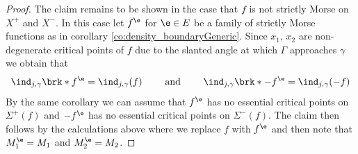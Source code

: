 \begin{proof}
  The claim remains to be shown in the case that $f$ is not strictly Morse on $X^+$ and $X^-$. In this case let
  $f^\e$ for $\e\in E$ be a family of strictly Morse functions as in corollary \ref{co:density_boundaryGeneric}.
  Since $x_1$, $x_2$ are non-degenerate critical points of $f$
  due to the slanted angle at which
  $\Gamma$ approaches $\gamma$
  we obtain that
  \begin{align}
    \ind_{j,\gamma}\brk*{f^\e}=\ind_{j,\gamma}(f)\qquad\text{ and }\qquad 
    \ind_{j,\gamma}\brk*{-f^\e}=\ind_{j,\gamma}(-f)
    \label{eq:n3_disproof_morse_indexApprox}
  \end{align}
  By the same corollary we can assume that $f^\e$ has no essential critical points on
  $\Sigma^+(f)$ and $-f^\e$ has no essential critical points on $\Sigma^-(f)$.
  The claim then follows by the calculations above where we replace
  $f$ with $f^\e$ and then note that $M_1^\e=M_1$ and $M_2^\e=M_2$.
\end{proof}


